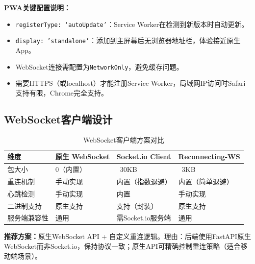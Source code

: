 \documentclass[fontset=mac,a4paper,11pt]{ctexart}
\begin{document}
\textbf{PWA关键配置说明：}
\begin{itemize}[leftmargin=2em]
\item \texttt{registerType: 'autoUpdate'}：Service Worker在检测到新版本时自动更新。
\item \texttt{display: 'standalone'}：添加到主屏幕后无浏览器地址栏，体验接近原生App。
\item WebSocket连接需配置为\texttt{NetworkOnly}，避免缓存问题。
\item 需要HTTPS（或localhost）才能注册Service Worker，局域网IP访问时Safari支持有限，Chrome完全支持。
\end{itemize}

\subsection{WebSocket客户端设计}

\begin{table}[H]
\centering
\caption{WebSocket客户端方案对比}
\label{tab:websocket-client}
\begin{tabular}{L{2.5cm}L{3.5cm}L{3.5cm}L{3.5cm}}
\toprule
\textbf{维度} & \textbf{原生 WebSocket} & \textbf{Socket.io Client} & \textbf{Reconnecting-WS} \\
\midrule
{}
包大小 & 0（内置） & ~30KB & ~3KB \\
重连机制 & 手动实现 & 内置（指数退避） & 内置（简单退避） \\
心跳检测 & 手动实现 & 内置 & 手动实现 \\
二进制支持 & 原生支持 & 支持（封装） & 原生支持 \\
服务端兼容性 & 通用 & 需Socket.io服务端 & 通用 \\
\bottomrule
\end{tabular}
\end{table}

\textbf{推荐方案：}原生WebSocket API + 自定义重连逻辑。理由：后端使用FastAPI原生WebSocket而非Socket.io，保持协议一致；原生API可精确控制重连策略（适合移动端场景）。
\end{document}
